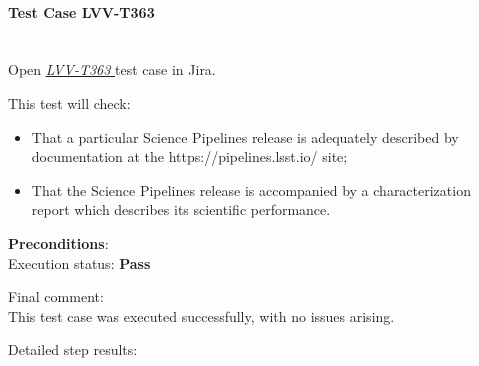 \documentclass[DM,lsstdraft,STR,toc]{lsstdoc}
\providecommand{\tightlist}{
  \setlength{\itemsep}{0pt}\setlength{\parskip}{0pt}}
\begin{document}
    \paragraph{Test Case LVV-T363 }\mbox{}\\

Open  \href{https://jira.lsstcorp.org/secure/Tests.jspa#/testCase/LVV-T363}{\textit{ LVV-T363 } }
test case in Jira.

    This test will check:

\begin{itemize}
\tightlist
\item
  That a particular Science Pipelines release is adequately described by
  documentation at the https://pipelines.lsst.io/ site;
\item
  That the Science Pipelines release is accompanied by a
  characterization report which describes its scientific performance.
\end{itemize}


    {\bf Preconditions}:\\
    

    Execution status: {\bf Pass }

    Final comment:\\This test case was executed successfully, with no issues arising.



    Detailed step results:
\end{document}

